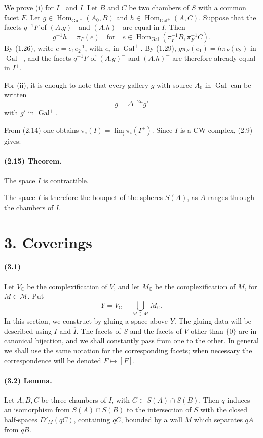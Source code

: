 \documentclass[10pt]{article}
\newcommand{\C}{\mathbb C}
\providecommand{\varinjlim}{\mathop{\mathrm{lim}}\limits_{\longrightarrow}}
\begin{document}
We prove (i) for \(I^+\) and \(I\). Let \(B\) and \(C\) be two chambers of \(S\) with a common facet \(F\). Let \(g\in\operatorname{Hom}_{\operatorname{Gal}^+}(A_0,B)\) and \(h\in\operatorname{Hom}_{\operatorname{Gal}^+}(A,C)\). Suppose that the facets \(q^{-1}F\) of \((A.g)^{-}\) and \((A.h)^{-}\) are equal in \(I\). Then
\[
g^{-1}h=\pi_F(e)
\quad\text{for}\quad
e\in\operatorname{Hom}_{\operatorname{Gal}}(\pi_F^{-1}B,\pi_F^{-1}C).
\]
By (1.26), write \(e=e_1e_2^{-1}\), with \(e_i\) in \(\operatorname{Gal}^+\). By (1.29), \(g\pi_F(e_1)=h\pi_F(e_2)\) in \(\operatorname{Gal}^+\), and the facets \(q^{-1}F\) of \((A.g)^{-}\) and \((A.h)^{-}\) are therefore already equal in \(I^+\).

For (ii), it is enough to note that every gallery \(g\) with source \(A_0\) in \(\operatorname{Gal}\) can be written
\[
g=\Delta^{-2n}g'
\]
with \(g'\) in \(\operatorname{Gal}^+\).

From (2.14) one obtains \(\pi_i(I)=\varinjlim\pi_i(I^+)\). Since \(I\) is a CW-complex, (2.9) gives:

\paragraph{(2.15) Theorem.} The space \(\overline I\) is contractible.

The space \(I\) is therefore the bouquet of the spheres \(S(A)\), as \(A\) ranges through the chambers of \(I\).

\section*{3. Coverings}

\paragraph{(3.1)} Let \(V_\C\) be the complexification of \(V\), and let \(M_\C\) be the complexification of \(M\), for \(M\in\mathcal M\). Put
\[
Y=V_\C-\bigcup_{M\in\mathcal M}M_\C.
\]
In this section, we construct by gluing a space above \(Y\). The gluing data will be described using \(I\) and \(\overline I\). The facets of \(S\) and the facets of \(V\) other than \(\{0\}\) are in canonical bijection, and we shall constantly pass from one to the other. In general we shall use the same notation for the corresponding facets; when necessary the correspondence will be denoted \(F\mapsto [F]\).

\paragraph{(3.2) Lemma.} Let \(A,B,C\) be three chambers of \(I\), with \(C\subset S(A)\cap S(B)\). Then \(q\) induces an isomorphism from \(S(A)\cap S(B)\) to the intersection of \(S\) with the closed half-spaces \(D'_M(qC)\), containing \(qC\), bounded by a wall \(M\) which separates \(qA\) from \(qB\).
\end{document}
